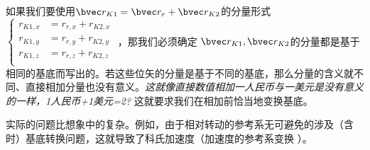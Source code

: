 如果我们要使用$\bvec r_{K1} = \bvec r_{r}+\bvec r_{K2}$的分量形式 
$
\begin{cases}
r_{K1,x}&=r_{r,x}+r_{K2,x}\\
r_{K1,y}&=r_{r,y}+r_{K2,y}\\
r_{K1,z}&=r_{r,z}+r_{K2,z}\\
\end{cases}
$
，那我们必须确定 $\bvec r_{K1}, \bvec r_{K2}$的分量都是基于相同的基底而写出的。若这些位矢的分量是基于不同的基底，那么分量的含义就不同、直接相加分量也没有意义。\textsl{这就像直接数值相加一人民币与一美元是没有意义的一样，1人民币+1美元=2?} 这就要求我们在相加前恰当地变换基底。

实际的问题比想象中的复杂。例如，由于相对转动的参考系无可避免的涉及（含时）基底转换问题，这就导致了科氏加速度（加速度的参考系变换 ）。
